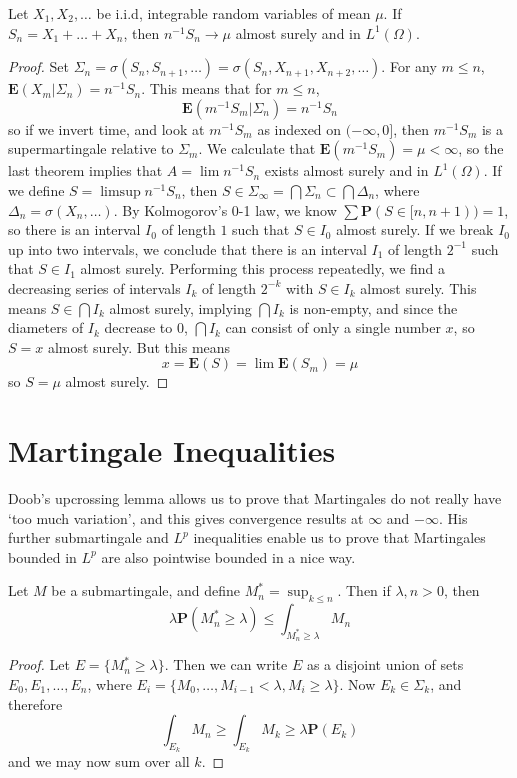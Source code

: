 \begin{corollary}
    Let $X_1, X_2, \dots$ be i.i.d, integrable random variables of mean $\mu$. If $S_n = X_1 + \dots + X_n$, then $n^{-1}S_n \to \mu$ almost surely and in $L^1(\Omega)$.
\end{corollary}
\begin{proof}
    Set $\Sigma_n = \sigma(S_n,S_{n+1}, \dots) = \sigma(S_n, X_{n+1}, X_{n+2}, \dots)$. For any $m \leq n$, $\mathbf{E}(X_m|\Sigma_n) = n^{-1}S_n$. This means that for $m \leq n$,
    \[ \mathbf{E}(m^{-1}S_m|\Sigma_n) = n^{-1}S_n \]
    so if we invert time, and look at $m^{-1}S_m$ as indexed on $(-\infty,0]$, then $m^{-1}S_m$ is a supermartingale relative to $\Sigma_m$. We calculate that $\mathbf{E}(m^{-1}S_m) = \mu < \infty$, so the last theorem implies that $A = \lim n^{-1}S_n$ exists almost surely and in $L^1(\Omega)$. If we define $S = \limsup n^{-1}S_n$, then $S \in \Sigma_\infty = \bigcap \Sigma_n \subset \bigcap \Delta_n$, where $\Delta_n = \sigma(X_n, \dots)$. By Kolmogorov's 0-1 law, we know $\sum \mathbf{P}(S \in [n,n+1)) = 1$, so there is an interval $I_0$ of length $1$ such that $S \in I_0$ almost surely. If we break $I_0$ up into two intervals, we conclude that there is an interval $I_1$ of length $2^{-1}$ such that $S \in I_1$ almost surely. Performing this process repeatedly, we find a decreasing series of intervals $I_k$ of length $2^{-k}$ with $S \in I_k$ almost surely. This means $S \in \bigcap I_k$ almost surely, implying $\bigcap I_k$ is non-empty, and since the diameters of $I_k$ decrease to $0$, $\bigcap I_k$ can consist of only a single number $x$, so $S = x$ almost surely. But this means
    \[ x = \mathbf{E}(S) = \lim \mathbf{E}(S_m) = \mu \]
    so $S = \mu$ almost surely.
\end{proof}

\section{Martingale Inequalities}

Doob's upcrossing lemma allows us to prove that Martingales do not really have `too much variation', and this gives convergence results at $\infty$ and $-\infty$. His further submartingale and $L^p$ inequalities enable us to prove that Martingales bounded in $L^p$ are also pointwise bounded in a nice way.

\begin{theorem}
    Let $M$ be a submartingale, and define $M^*_n = \sup_{k \leq n}$. Then if $\lambda, n > 0$, then
    \[ \lambda \mathbf{P} \left( M^*_n \geq \lambda \right) \leq \int_{M^*_n \geq \lambda} M_n \]
\end{theorem}
\begin{proof}
    Let $E = \{ M^*_n \geq \lambda \}$. Then we can write $E$ as a disjoint union of sets $E_0,E_1,\dots, E_n$, where $E_i = \{ M_0, \dots, M_{i-1} < \lambda, M_i \geq \lambda \}$. Now $E_k \in \Sigma_k$, and therefore
    \[ \int_{E_k} M_n \geq \int_{E_k} M_k \geq \lambda \mathbf{P}(E_k) \]
    and we may now sum over all $k$.
\end{proof}

